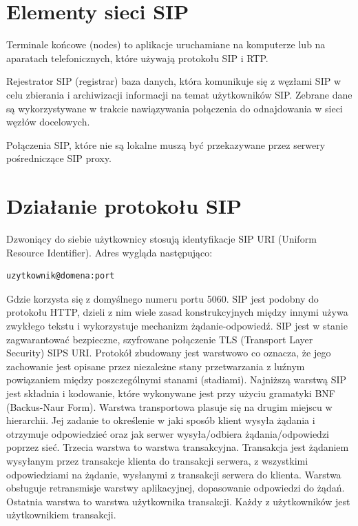 \section{Elementy sieci SIP}

Terminale końcowe (nodes) to aplikacje uruchamiane na komputerze lub na aparatach telefonicznych, które używają protokołu SIP i RTP.

Rejestrator SIP (registrar) baza danych, która komunikuje się z węzłami SIP w celu zbierania i archiwizacji informacji na temat użytkowników SIP. Zebrane dane są wykorzystywane w trakcie nawiązywania połączenia do odnajdowania w sieci węzłów docelowych.

Połączenia SIP, które nie są lokalne muszą być przekazywane przez serwery pośredniczące SIP proxy. 



\section{Działanie protokołu SIP}


Dzwoniący do siebie użytkownicy stosują identyfikacje SIP URI (Uniform Resource Identifier). Adres wygląda następująco:
\begin{lstlisting}
uzytkownik@domena:port
\end{lstlisting}
Gdzie korzysta się z domyślnego numeru portu 5060.
SIP jest podobny do protokołu HTTP, dzieli z nim wiele zasad konstrukcyjnych między innymi używa zwykłego tekstu i wykorzystuje mechanizm żądanie-odpowiedź. SIP jest w stanie zagwarantować bezpieczne, szyfrowane połączenie TLS (Transport Layer Security) SIPS URI. Protokół zbudowany jest warstwowo co oznacza, że jego zachowanie jest opisane przez niezależne stany przetwarzania z luźnym powiązaniem między poszczególnymi stanami (stadiami). Najniższą warstwą SIP jest składnia i kodowanie, które wykonywane jest przy użyciu gramatyki BNF (Backus-Naur Form). Warstwa transportowa plasuje się na drugim miejscu w hierarchii. Jej zadanie to określenie w jaki sposób klient wysyła żądania i otrzymuje odpowiedzieć oraz jak serwer wysyła/odbiera żądania/odpowiedzi poprzez sieć. Trzecia warstwa to warstwa transakcyjna. Transakcja jest żądaniem wysyłanym przez transakcje klienta do transakcji serwera, z wszystkimi odpowiedziami na żądanie, wysłanymi z transakcji serwera do klienta. Warstwa obsługuje retransmisje warstwy aplikacyjnej, dopasowanie odpowiedzi do żądań. Ostatnia warstwa to warstwa użytkownika transakcji. Każdy z użytkowników jest użytkownikiem transakcji. 




